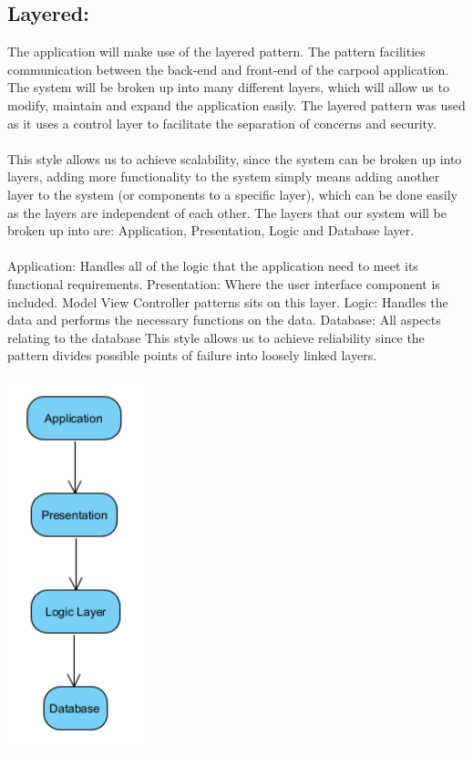 \documentclass[hidelinks, 12pt, a4paper]{article}
\begin{document}
\subsection{\textbf{Layered:}}
\newline
The application will make use of the layered pattern. The pattern facilities communication between the back-end and front-end of the carpool application. The system will be broken up into many different layers, which will allow us to modify, maintain and expand the application easily.
The layered pattern was used as it uses a control layer to facilitate the separation of concerns and security. \\ \\
This style allows us to achieve scalability, since the system can be broken up into layers, adding more functionality to the system simply means adding another layer to the system (or components to a specific layer), which can be done easily as the layers are independent of each other. The layers that our system will be broken up into are: Application, Presentation, Logic and Database layer.\\ \\
Application: Handles all of the logic that the application need to meet its functional requirements.
Presentation: Where the user interface component is included. Model View Controller patterns sits on this layer.
Logic: Handles the data and performs the necessary functions on the data.
Database: All aspects relating to the database
This style allows us to achieve reliability since the pattern divides possible points of failure into loosely linked layers.
\begin{center}
    \noindent
    \includegraphics[width=4cm]{images/layered.png}
    \vspace{0.5cm}
\end{center}
\end{document}
